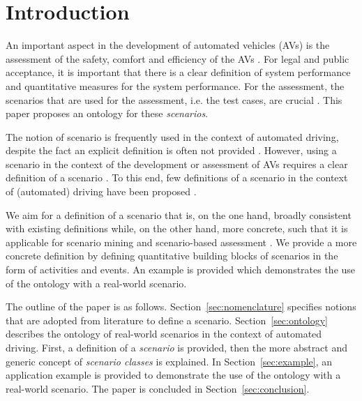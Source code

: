 \section{Introduction}
\label{sec:introduction}

An important aspect in the development of automated vehicles (AVs) is the assessment of the safety, comfort and efficiency of the AVs \cite{bengler2014threedecades, stellet2015taxonomy, Helmer2017safety, putz2017pegasus, roesener2017comprehensive, gietelink2006development}. For legal and public acceptance, it is important that there is a clear definition of system performance and quantitative measures for the system performance. For the assessment, the scenarios that are used for the assessment, i.e. the test cases, are crucial \cite{stellet2015taxonomy}. This paper proposes an ontology for these \emph{scenarios}.

The notion of scenario is frequently used in the context of automated driving, despite the fact an explicit definition is often not provided \cite{putz2017pegasus, roesener2017comprehensive, gietelink2006development, hulshof2013autonomous, karaduman2013interactivebehavior, englund2016grand, xu2002effects, ebner2011identifying, ploeg2017GCDC, zofka2015datadrivetrafficscenarios}. However, using a scenario in the context of the development or assessment of AVs requires a clear definition of a scenario \cite{stellet2015taxonomy, Helmer2017safety, alvarez2017prospective, zofka2015datadrivetrafficscenarios, aparicio2013pre, lesemann2011test, putz2017pegasus, geyer2014, ulbrich2015}. To this end, few definitions of a scenario in the context of (automated) driving have been proposed \cite{geyer2014, ulbrich2015, elrofai2016scenario}.

We aim for a definition of a scenario that is, on the one hand, broadly consistent with existing definitions \cite{geyer2014, ulbrich2015, elrofai2016scenario} while, on the other hand, more concrete, such that it is applicable for scenario mining \cite{elrofai2016scenario} and scenario-based assessment \cite{stellet2015taxonomy, deGelder2017assessment}. We provide a more concrete definition by defining quantitative building blocks of scenarios in the form of activities and events. An example is provided which demonstrates the use of the ontology with a real-world scenario.

The outline of the paper is as follows. Section~\ref{sec:nomenclature} specifies notions that are adopted from literature to define a scenario. Section~\ref{sec:ontology} describes the ontology of real-world scenarios in the context of automated driving. First, a definition of a \emph{scenario} is provided, then the more abstract and generic concept of \emph{scenario classes} is explained. In Section~\ref{sec:example}, an application example is provided to demonstrate the use of the ontology with a real-world scenario. 
The paper is concluded in Section~\ref{sec:conclusion}.
